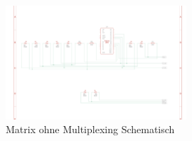 \begin{figure}[htbp] %
	\centering
	\includegraphics[width=0.6\textwidth]{img/LEDMatrixSchaltung}
	\caption{Matrix ohne Multiplexing Schematisch}
	\label{fig:Matrix}
\end{figure}
